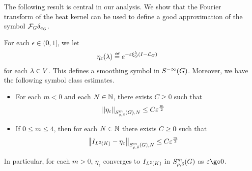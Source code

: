 The following result is central in our analysis.
We show that the Fourier transform of the heat kernel can be used to define a good approximation of the symbol $\Fourier \delta_{e_\Group}$.

\begin{theorem}
\label{theorem:generalised_Littlewood-Paley_decomposition}
    For each $\epsilon \in (0, 1]$,
    we let
    \begin{align*}
        \eta_\epsilon(\lambda) \defeq \e^{-\epsilon \Rep \lambda \BesselPotentialSquared {}}
    \end{align*}
    for each $\lambda \in \VectorSpace$.
    This defines a smoothing symbol in $\SmoothingSymbols$.
    Moreover, we have the following symbol class estimates.
    \begin{itemize}
        \item
            For each $m < 0$ and each $N \in \N$,
            there exists $C \geq 0$ such that
            \begin{align*}
                \SymbolSemiNorm m {\rho, \delta} N {\eta_\epsilon} \leq C \epsilon^\frac m 2
            \end{align*}
        \item
            If $0 \leq m \leq 4$,
            then for each $N \in \N$
            there exists $C \geq 0$ such that
            \begin{align*}
                \SymbolSemiNorm m {\rho, \delta} N {\Id {\Lebesgue 2 \CompactGroup} - \eta_\epsilon} \leq C \epsilon^\frac m 2
            \end{align*}
    \end{itemize}

    In particular, for each $m > 0$, $\eta_\epsilon$ converges to $\Id {\Lebesgue 2 \CompactGroup}$ in $\SymbolClass m {\rho, \delta}$ as $\epsilon \go 0$.
\end{theorem}
